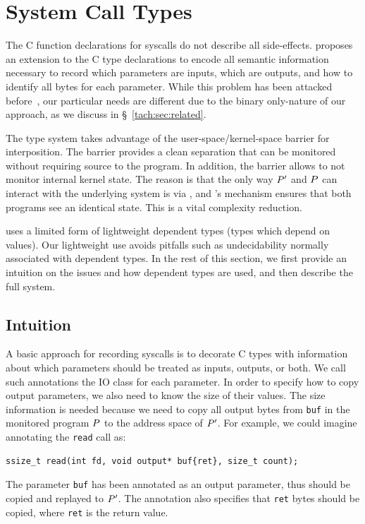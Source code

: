 \section{System Call Types}
\label{tach:sec:types}

The C function declarations for syscalls do not describe all
side-effects. \tachyon proposes an extension to the C type
declarations to encode all semantic information necessary to record
which parameters are inputs, which are outputs, and how to identify
all bytes for each parameter. While this problem has been attacked before~\cite{guo:2008},
our particular needs are different due to the binary only-nature of our
approach, as we discuss in \S~\ref{tach:sec:related}.

The \tachyon type system takes advantage of the
user-space/kernel-space barrier for interposition. The barrier
provides a clean separation that can be monitored without
requiring source to the program. In addition, the barrier allows
\tachyon to not monitor internal kernel state. The reason is that the only
way $P'$ and $P$ can interact with the underlying
system is via \tachyon, and \tachyon's mechanism ensures that both
programs see an identical state.  This is a vital complexity
reduction.

\tachyon uses a limited form of lightweight dependent types (types
which depend on values). Our lightweight use avoids pitfalls such as
undecidability normally associated with dependent types. In the rest
of this section, we first provide an intuition on the issues and how
dependent types are used, and then describe the full system.


\subsection{Intuition}

A basic approach for recording syscalls is to decorate C types with
information about which parameters should be treated as inputs,
outputs, or both.  We call such annotations the IO class for each
parameter.  In order to specify how to copy output parameters, we also
need to know the size of their values.  The size information is needed
because we need to copy all output bytes from {\tt buf} in the
monitored program $P$ to the address space of $P'$.
For example, we could imagine annotating the {\tt read} call as:
\begin{lstlisting}
ssize_t read(int fd, void output* buf{ret}, size_t count);
\end{lstlisting}
The parameter {\tt buf} has been annotated as an output parameter,
thus should be copied and replayed to $P'$.  The annotation
also specifies that {\tt ret} bytes should be copied, where {\tt ret}
is the return value.


